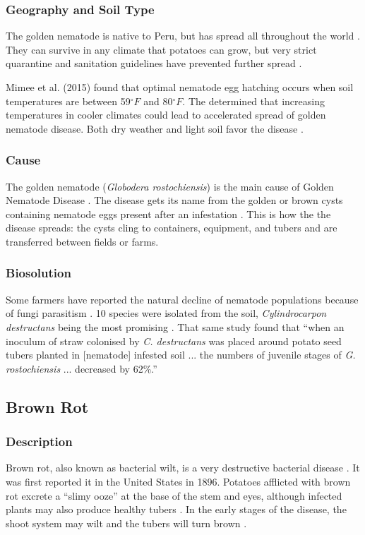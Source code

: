\documentclass[12pt]{article}
\begin{document}
\subsubsection{Geography and Soil Type}
The golden nematode is native to Peru, but has spread all throughout the world \autocite{rich2013potato}. They can survive in any climate that potatoes can grow, but very strict quarantine and sanitation guidelines have prevented further spread \autocite{evans1980origin}.

Mimee et al. (2015) found that optimal nematode egg hatching occurs when soil temperatures are between 59$^\circ F$ and 80$^\circ F$. The determined that increasing temperatures in cooler climates could lead to accelerated spread of golden nematode disease. Both dry weather and light soil favor the disease \autocite{rich2013potato}.

\subsubsection{Cause}

The golden nematode (\emph{Globodera rostochiensis}) is the main cause of Golden Nematode Disease \autocite{rich2013potato}. The disease gets its name from the golden or brown cysts containing nematode eggs present after an infestation \autocite{rich2013potato}. This is how the the disease spreads: the cysts cling to containers, equipment, and tubers and are transferred between fields or farms.

\subsubsection{Biosolution}

Some farmers have reported the natural decline of nematode populations because of fungi parasitism \autocite{evans1993reviews}. 10 species were isolated from the soil, \emph{Cylindrocarpon destructans} being the most promising \autocite{evans1993reviews}. That same study found that ``when an inoculum of straw colonised by \emph{C. destructans} was placed around potato seed tubers planted in [nematode] infested soil ... the numbers of juvenile stages of \emph{G. rostochiensis} ... decreased by 62\%.''


\subsection{Brown Rot}

\subsubsection{Description}
Brown rot, also known as bacterial wilt, is a very destructive bacterial disease \autocite{rich2013potato}. It was first reported it in the United States in 1896. Potatoes afflicted with brown rot excrete a ``slimy ooze'' at the base of the stem and eyes, although infected plants may also produce healthy tubers \autocite{rich2013potato}. In the early stages of the disease, the shoot system may wilt and the tubers will turn brown \autocite{kabeil2008potato}.
\end{document}
